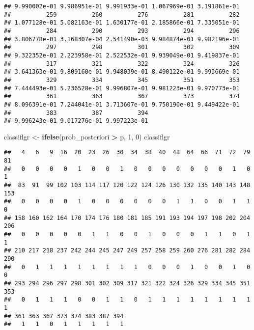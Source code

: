 \documentclass[]{article}
\newenvironment{Shaded}{\begin{snugshade}}{\end{snugshade}}
\newcommand{\KeywordTok}[1]{\textcolor[rgb]{0.13,0.29,0.53}{\textbf{#1}}}
\newcommand{\DecValTok}[1]{\textcolor[rgb]{0.00,0.00,0.81}{#1}}
\newcommand{\StringTok}[1]{\textcolor[rgb]{0.31,0.60,0.02}{#1}}
\newcommand{\OperatorTok}[1]{\textcolor[rgb]{0.81,0.36,0.00}{\textbf{#1}}}
\newcommand{\NormalTok}[1]{#1}
\begin{document}
\begin{verbatim}
## 9.990002e-01 9.986951e-01 9.991933e-01 1.067969e-01 3.191861e-01 
##          259          260          276          281          282 
## 1.077128e-01 5.082163e-01 1.630177e-01 2.185866e-01 7.335051e-01 
##          284          290          293          294          296 
## 3.806778e-01 3.168307e-04 2.541490e-03 9.984874e-01 9.982196e-01 
##          297          298          301          302          309 
## 9.322352e-01 2.223958e-01 2.522532e-01 9.939049e-01 9.419837e-01 
##          317          321          322          324          326 
## 3.641363e-01 9.809160e-01 9.948039e-01 8.490122e-01 9.993669e-01 
##          329          334          345          351          353 
## 7.444493e-01 5.236528e-01 9.996807e-01 9.981223e-01 9.970773e-01 
##          361          363          367          373          374 
## 8.096391e-01 7.244041e-01 3.713607e-01 9.750190e-01 9.449422e-01 
##          383          387          394 
## 9.996243e-01 9.017276e-01 9.997223e-01
\end{verbatim}

\begin{Shaded}
\begin{Highlighting}[]
\NormalTok{classiflgr <-}\StringTok{ }\KeywordTok{ifelse}\NormalTok{(prob_posteriori }\OperatorTok{>}\StringTok{ }\NormalTok{p, }\DecValTok{1}\NormalTok{, }\DecValTok{0}\NormalTok{) }
\NormalTok{classiflgr}
\end{Highlighting}
\end{Shaded}

\begin{verbatim}
##   4   6   9  16  20  23  26  30  34  38  40  48  64  66  71  72  79  81 
##   0   0   0   0   1   0   0   1   0   0   0   0   0   0   0   1   0   1 
##  83  91  99 102 103 114 117 120 122 124 126 130 132 135 140 143 148 153 
##   0   0   0   0   1   0   0   0   0   0   0   1   1   0   0   1   1   0 
## 158 160 162 164 170 174 176 180 181 185 191 193 194 197 198 202 204 206 
##   0   0   0   0   0   1   1   0   0   1   0   0   0   1   1   0   1   1 
## 210 217 218 237 242 244 245 247 249 257 258 259 260 276 281 282 284 290 
##   0   1   1   1   1   1   1   1   1   0   0   0   1   0   0   1   0   0 
## 293 294 296 297 298 301 302 309 317 321 322 324 326 329 334 345 351 353 
##   0   1   1   1   0   0   1   1   0   1   1   1   1   1   1   1   1   1 
## 361 363 367 373 374 383 387 394 
##   1   1   0   1   1   1   1   1
\end{verbatim}

\begin{Shaded}
\end{Shaded}
\end{document}
